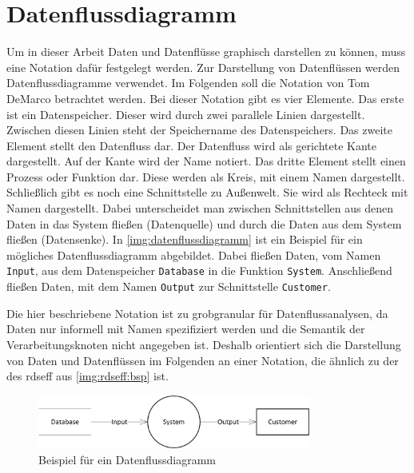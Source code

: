\section{Datenflussdiagramm}
\label{sec:datenflussdiagramm}
Um in dieser Arbeit Daten und Datenflüsse graphisch darstellen zu können, muss eine Notation dafür festgelegt werden. Zur Darstellung von Datenflüssen werden Datenflussdiagramme verwendet. Im Folgenden soll die Notation von Tom DeMarco \cite{Tom1979} betrachtet werden. Bei dieser Notation gibt es vier Elemente. Das erste ist ein Datenspeicher. Dieser wird durch zwei parallele Linien dargestellt. Zwischen diesen Linien steht der Speichername des Datenspeichers. Das zweite Element stellt den Datenfluss dar. Der Datenfluss wird als gerichtete Kante dargestellt. Auf der Kante wird der Name notiert. Das dritte Element stellt einen Prozess oder Funktion dar. Diese werden als Kreis, mit einem Namen dargestellt. Schließlich gibt es noch eine Schnittstelle zu Außenwelt. Sie wird als Rechteck mit Namen dargestellt. Dabei unterscheidet man zwischen Schnittstellen aus denen Daten in das System fließen (Datenquelle) und durch die Daten aus dem System fließen (Datensenke). In \autoref{img:datenflussdiagramm} ist ein Beispiel für ein mögliches Datenflussdiagramm abgebildet. Dabei fließen Daten, vom Namen \texttt{Input}, aus dem Datenspeicher \texttt{Database} in die Funktion \texttt{System}. Anschließend fließen Daten, mit dem Namen \texttt{Output} zur Schnittstelle \texttt{Customer}. \par
Die hier beschriebene Notation ist zu grobgranular für Datenflussanalysen, da Daten nur informell mit Namen spezifiziert werden und die Semantik der Verarbeitungsknoten nicht angegeben ist. Deshalb orientiert sich die Darstellung von Daten und Datenflüssen im Folgenden an einer Notation, die ähnlich zu der des \gls{rdseff} aus \autoref{img:rdseff:bsp} ist. 
\begin{figure}[h]
	\centering
  	\includegraphics[width=0.8\textwidth]{images/datenflussdiagramm.png}
	\caption{Beispiel für ein Datenflussdiagramm}
	\label{img:datenflussdiagramm}
\end{figure}

